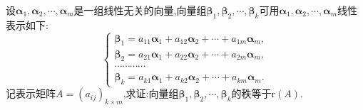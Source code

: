 \documentclass[../../main.tex]{subfiles}%
\begin{document}
\begin{proposition}\label{proposition:线性无关向量组的命题6}
设\(\boldsymbol{\alpha}_1,\boldsymbol{\alpha}_2,\cdots,\boldsymbol{\alpha}_m\)是一组线性无关的向量,向量组\(\boldsymbol{\beta}_1,\boldsymbol{\beta}_2,\cdots,\boldsymbol{\beta}_k\)可用\(\boldsymbol{\alpha}_1,\boldsymbol{\alpha}_2,\cdots,\boldsymbol{\alpha}_m\)线性表示如下:
\[
\begin{cases}
\boldsymbol{\beta}_1 = a_{11}\boldsymbol{\alpha}_1 + a_{12}\boldsymbol{\alpha}_2+\cdots + a_{1m}\boldsymbol{\alpha}_m,\\
\boldsymbol{\beta}_2 = a_{21}\boldsymbol{\alpha}_1 + a_{22}\boldsymbol{\alpha}_2+\cdots + a_{2m}\boldsymbol{\alpha}_m,\\
\cdots\cdots\cdots\cdots\\
\boldsymbol{\beta}_k = a_{k1}\boldsymbol{\alpha}_1 + a_{k2}\boldsymbol{\alpha}_2+\cdots + a_{km}\boldsymbol{\alpha}_m.
\end{cases}
\]
记表示矩阵\(A=(a_{ij})_{k\times m}\),求证:向量组\(\boldsymbol{\beta}_1,\boldsymbol{\beta}_2,\cdots,\boldsymbol{\beta}_k\)的秩等于\(\text{r}(A)\).
\end{proposition}
\end{document}
